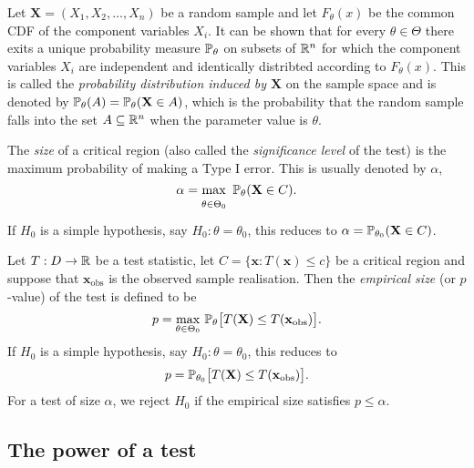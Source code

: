 \begin{definition}
Let $\mathbf{X}=(X_1,X_2,\ldots,X_n)$ be a random sample and let $F_{\theta}(x)$ be the common CDF of the component variables $X_i$. It can be shown that for every $\theta\in\Theta$ there exits a unique probability measure $\mathbb{P}_\theta$ on subsets of $\mathbb{R}^n$ for which the component variables $X_i$ are independent and identically distribted according to $F_{\theta}(x)$. This is called the \emph{probability distribution induced by $\mathbf{X}$} on the sample space and is denoted by $\mathbb{P}_{\theta}(A)=\mathbb{P}_{\theta}(\mathbf{X}\in A)$, which is the probability that %
the random sample falls into the set $A\subseteq\mathbb{R}^n$ when the parameter value is $\theta$.%
\end{definition}

\begin{definition}
The \emph{size} of a critical region (also called the \emph{significance level} of the test) is the maximum probability of making a Type I error. This is usually denoted by $\alpha$,
\[
\alpha = \max_{\strut\theta\in\Theta_0}\ \prob_{\theta}(\mathbf{X}\in C).
\]
If $H_0$ is a simple hypothesis, say $H_0:\theta=\theta_0$, this reduces to $\alpha = \mathbb{P}_{\theta_0}(\mathbf{X}\in C)$.
\end{definition}

\begin{remark}[$p$-values]
Let $T:D\to\mathbb{R}$ be a test statistic, let $C = \{\mathbf{x} : T(\mathbf{x}) \leq c\}$ be a critical region and suppose that $\mathbf{x}_{\text{obs}}$ is the observed sample realisation. Then the \emph{empirical size} (or $p$-value) of the test is defined to be
\[
p = \max_{\theta\in\Theta_0}\,\mathbb{P}_{\theta}\big[ T(\mathbf{X})\leq T(\mathbf{x}_{\text{obs}})\big].
\]
If $H_0$ is a simple hypothesis, say $H_0:\theta=\theta_0$, this reduces to 
\[
p = \mathbb{P}_{\theta_0}\big[ T(\mathbf{X})\leq T(\mathbf{x}_{\text{obs}})\big].
\] 
For a test of size $\alpha$, we reject $H_0$ if the empirical size satisfies $p\leq\alpha$.
\end{remark}


\subsection{The power of a test} 

